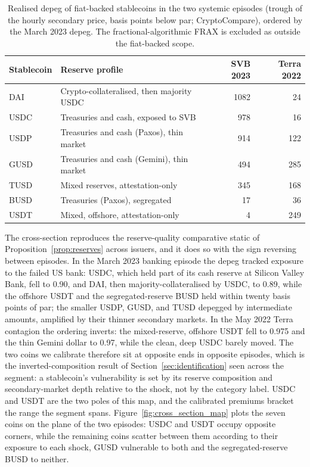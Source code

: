 \begin{table}[H]
\centering
\caption{Realised depeg of fiat-backed stablecoins in the two systemic episodes (trough of the hourly secondary price, basis points below par; CryptoCompare), ordered by the March 2023 depeg. The fractional-algorithmic FRAX is excluded as outside the fiat-backed scope.}\label{tab:cross_section}
\begin{tabular}{llrr}
\toprule
Stablecoin & Reserve profile & SVB 2023 & Terra 2022 \\
\midrule
DAI  & Crypto-collateralised, then majority USDC & 1082 & 24 \\
USDC & Treasuries and cash, exposed to SVB        & 978  & 16 \\
USDP & Treasuries and cash (Paxos), thin market   & 914  & 122 \\
GUSD & Treasuries and cash (Gemini), thin market  & 494  & 285 \\
TUSD & Mixed reserves, attestation-only           & 345  & 168 \\
BUSD & Treasuries (Paxos), segregated             & 17   & 36 \\
USDT & Mixed, offshore, attestation-only          & 4    & 249 \\
\bottomrule
\end{tabular}
\end{table}

The cross-section reproduces the reserve-quality comparative static of Proposition~\ref{prop:reserves} across issuers, and it does so with the sign reversing between episodes. In the March 2023 banking episode the depeg tracked exposure to the failed US bank: USDC, which held part of its cash reserve at Silicon Valley Bank, fell to 0.90, and DAI, then majority-collateralised by USDC, to 0.89, while the offshore USDT and the segregated-reserve BUSD held within twenty basis points of par; the smaller USDP, GUSD, and TUSD depegged by intermediate amounts, amplified by their thinner secondary markets. In the May 2022 Terra contagion the ordering inverts: the mixed-reserve, offshore USDT fell to 0.975 and the thin Gemini dollar to 0.97, while the clean, deep USDC barely moved. The two coins we calibrate therefore sit at opposite ends in opposite episodes, which is the inverted-composition result of Section~\ref{sec:identification} seen across the segment: a stablecoin's vulnerability is set by its reserve composition and secondary-market depth relative to the shock, not by the category label. USDC and USDT are the two poles of this map, and the calibrated premiums bracket the range the segment spans. Figure~\ref{fig:cross_section_map} plots the seven coins on the plane of the two episodes: USDC and USDT occupy opposite corners, while the remaining coins scatter between them according to their exposure to each shock, GUSD vulnerable to both and the segregated-reserve BUSD to neither.


